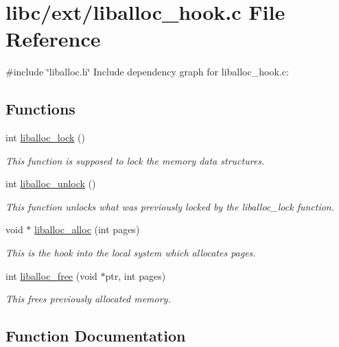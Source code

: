\hypertarget{a00041}{}\section{libc/ext/liballoc\+\_\+hook.c File Reference}
\label{a00041}
{\ttfamily \#include \char`\"{}liballoc.\+h\char`\"{}}\newline
Include dependency graph for liballoc\+\_\+hook.\+c\+:
\subsection*{Functions}
\begin{DoxyCompactItemize}
\item 
int \hyperlink{a00041_a8b5670e4594b0b6f8be78fe17f0c3b53_a8b5670e4594b0b6f8be78fe17f0c3b53}{liballoc\+\_\+lock} ()
\begin{DoxyCompactList}\small\item\em This function is supposed to lock the memory data structures. \end{DoxyCompactList}\item 
int \hyperlink{a00041_aedc23f198b2882d41d0caa316453967b_aedc23f198b2882d41d0caa316453967b}{liballoc\+\_\+unlock} ()
\begin{DoxyCompactList}\small\item\em This function unlocks what was previously locked by the liballoc\+\_\+lock function. \end{DoxyCompactList}\item 
void $\ast$ \hyperlink{a00041_a857110476fa9dd6317f60a76793a3274_a857110476fa9dd6317f60a76793a3274}{liballoc\+\_\+alloc} (int pages)
\begin{DoxyCompactList}\small\item\em This is the hook into the local system which allocates pages. \end{DoxyCompactList}\item 
int \hyperlink{a00041_aee2dc12f19409f4a76b2aa36f5ab1316_aee2dc12f19409f4a76b2aa36f5ab1316}{liballoc\+\_\+free} (void $\ast$ptr, int pages)
\begin{DoxyCompactList}\small\item\em This frees previously allocated memory. \end{DoxyCompactList}\end{DoxyCompactItemize}


\subsection{Function Documentation}
\mbox{\label{a00041_a857110476fa9dd6317f60a76793a3274_a857110476fa9dd6317f60a76793a3274}} 
